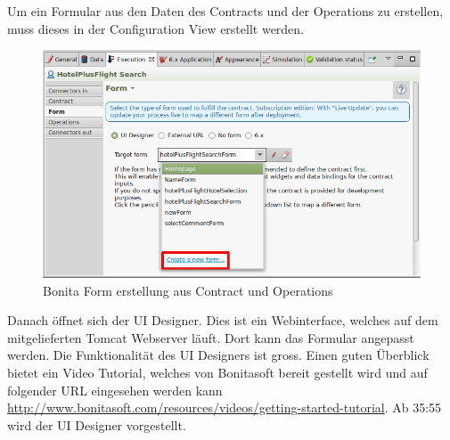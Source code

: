 Um ein Formular aus den Daten des Contracts und der Operations zu erstellen, muss dieses in der Configuration View erstellt werden.
\begin{figure}[H]
	\centering
	\includegraphics[width=1\textwidth]{images/bonita-forms-create.png}
	\caption{Bonita Form erstellung aus Contract und Operations}
	\label{fig:analyse:bonita:forms:forms:creation}
\end{figure}

Danach öffnet sich der UI Designer. Dies ist ein Webinterface, welches auf dem mitgelieferten Tomcat Webserver läuft. Dort kann das Formular angepasst werden.
Die Funktionalität des UI Designers ist gross. Einen guten Überblick bietet ein Video Tutorial, welches von Bonitasoft bereit gestellt wird und auf folgender URL eingesehen werden kann \url{http://www.bonitasoft.com/resources/videos/getting-started-tutorial}. Ab 35:55 wird der UI Designer vorgestellt.